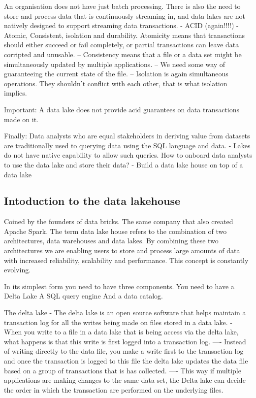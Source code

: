 \documentclass[a4paper, 11pt]{article}
\begin{document}
    An organisation does not have just batch processing.
    There is also the need to store and process data that is continuously streaming in, and data lakes are not natively designed to support streaming data transactions.
    - ACID (again!!!!) - Atomic, Consistent, isolation and durability.
    Atomicity means that transactions should either succeed or fail completely, or partial transactions can leave data corripted and unusable.
    -- Consistency means that a file or a data set might be simultaneously updated by multiple applications.
    -- We need some way of guaranteeing the current state of the file.
    -- Isolation is again simultaneous operations. They shouldn't conflict with each other, that is what isolation implies.

    Important: A data lake does not provide acid guarantees on data transactions made on it.

    Finally: Data analysts who are equal stakeholders in deriving value from datasets are traditionally used to querying data using the SQL language and data.
    - Lakes do not have native capability to allow such queries.
    How to onboard data analysts to use the data lake and store their data?
    - Build a data lake house on top of a data lake

    \subsection{Intoduction to the data lakehouse}

    Coined by the founders of data bricks. The same company that also created Apache Spark.
    The term data lake house refers to the combination of two architectures, data warehouses and data lakes.
    By combining these two architectures we are enabling users to store and process large amounts of data with increased reliability, scalability and performance.
    This concept is constantly evolving.

    In its simplest form you need to have three components.
    You need to have a Delta Lake
    A SQL query engine
    And a data catalog.

    The delta lake
    - The delta lake is an open source software that helps maintain a transaction log for all the writes being made on files stored in a data lake.
    - When you write to a file in a data lake that is being access via the delta lake, what happens is that this write  is first logged into a transaction log.
    ---- Instead of writing directly to the data file, you make a write first to the transaction log and once the transaction is logged to this file the delta lake updates the data file based on a group of transactions that is has collected.
    ---- This way if multiple applications are making changes to the same data set, the Delta lake can decide the order in which the transaction are performed on the underlying files.
\end{document}
